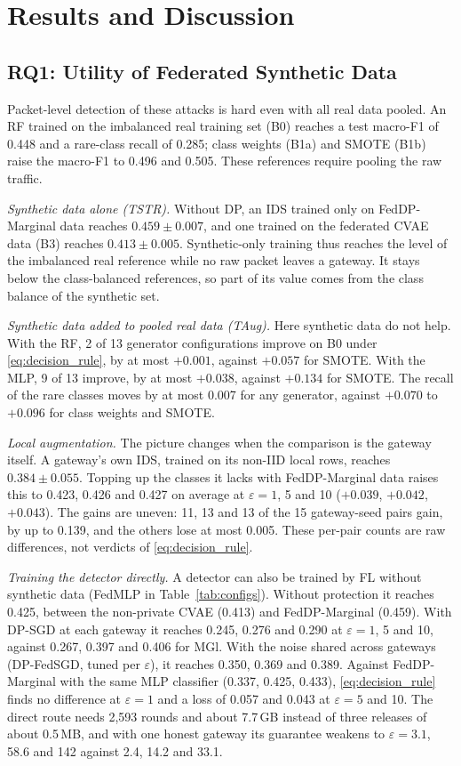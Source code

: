 \section{Results and Discussion}\label{sec:results}

\subsection{RQ1: Utility of Federated Synthetic Data}\label{subsec:rq1}
Packet-level detection of these attacks is hard even with all real data pooled. An RF trained on the imbalanced real training set (B0) reaches a test macro-F1 of 0.448 and a rare-class recall of 0.285; class weights (B1a) and SMOTE (B1b) raise the macro-F1 to 0.496 and 0.505. These references require pooling the raw traffic.

\textit{Synthetic data alone (TSTR).} Without DP, an IDS trained only on FedDP-Marginal data reaches $0.459 \pm 0.007$, and one trained on the federated CVAE data (B3) reaches $0.413 \pm 0.005$. Synthetic-only training thus reaches the level of the imbalanced real reference while no raw packet leaves a gateway. It stays below the class-balanced references, so part of its value comes from the class balance of the synthetic set.

\textit{Synthetic data added to pooled real data (TAug).} Here synthetic data do not help. With the RF, 2 of 13 generator configurations improve on B0 under \eqref{eq:decision_rule}, by at most $+0.001$, against $+0.057$ for SMOTE. With the MLP, 9 of 13 improve, by at most $+0.038$, against $+0.134$ for SMOTE. The recall of the rare classes moves by at most 0.007 for any generator, against $+0.070$ to $+0.096$ for class weights and SMOTE.

\textit{Local augmentation.} The picture changes when the comparison is the gateway itself. A gateway's own IDS, trained on its non-IID local rows, reaches $0.384 \pm 0.055$. Topping up the classes it lacks with FedDP-Marginal data raises this to 0.423, 0.426 and 0.427 on average at $\varepsilon = 1$, 5 and 10 ($+0.039$, $+0.042$, $+0.043$). The gains are uneven: 11, 13 and 13 of the 15 gateway-seed pairs gain, by up to 0.139, and the others lose at most 0.005. These per-pair counts are raw differences, not verdicts of \eqref{eq:decision_rule}.

\textit{Training the detector directly.} A detector can also be trained by FL without synthetic data (FedMLP in Table~\ref{tab:configs}). Without protection it reaches 0.425, between the non-private CVAE (0.413) and FedDP-Marginal (0.459). With DP-SGD at each gateway it reaches 0.245, 0.276 and 0.290 at $\varepsilon = 1$, 5 and 10, against 0.267, 0.397 and 0.406 for MGl. With the noise shared across gateways (DP-FedSGD, tuned per $\varepsilon$), it reaches 0.350, 0.369 and 0.389. Against FedDP-Marginal with the same MLP classifier (0.337, 0.425, 0.433), \eqref{eq:decision_rule} finds no difference at $\varepsilon = 1$ and a loss of 0.057 and 0.043 at $\varepsilon = 5$ and 10. The direct route needs 2,593 rounds and about 7.7\,GB instead of three releases of about 0.5\,MB, and with one honest gateway its guarantee weakens to $\varepsilon = 3.1$, 58.6 and 142 against 2.4, 14.2 and 33.1.

